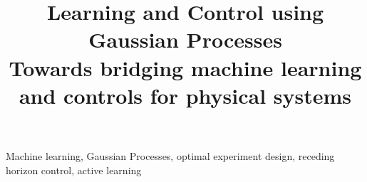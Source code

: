 \documentclass[conference]{IEEEtran}
\begin{document}
\title{Learning and Control using Gaussian Processes \\
	\vspace{0.1cm}
	\Large \textbf{Towards bridging machine learning and controls for physical systems}}


\author{
}


\maketitle



\begin{IEEEkeywords}
Machine learning, Gaussian Processes, optimal experiment design, receding horizon control, active learning
\end{IEEEkeywords}










%


 
\end{document}
